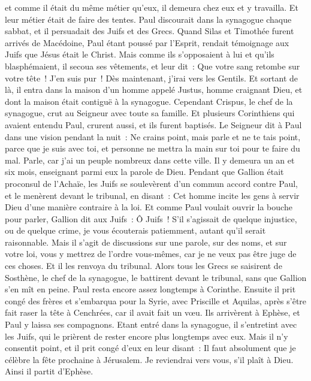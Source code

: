 \begin{multicols}{2}
et comme il était du même métier qu'eux, il demeura chez eux et y travailla. Et leur métier était de faire des tentes.
Paul discourait dans la synagogue chaque sabbat, et il persuadait des Juifs et des Grecs.
Quand Silas et Timothée furent arrivés de Macédoine, Paul étant poussé par l'Esprit, rendait témoignage aux Juifs que Jésus était le Christ.
Mais comme ils s'opposaient à lui et qu'ils blasphémaient, il secoua ses vêtements, et leur dit~: Que votre sang retombe sur votre tête~! J'en suis pur~! Dès maintenant, j'irai vers les Gentils.
Et sortant de là, il entra dans la maison d'un homme appelé Justus, homme craignant Dieu, et dont la maison était contiguë à la synagogue.
Cependant Crispus, le chef de la synagogue, crut au Seigneur avec toute sa famille. Et plusieurs Corinthiens qui avaient entendu Paul, crurent aussi, et ils furent baptisés.
Le Seigneur dit à Paul dans une vision pendant la nuit~: Ne crains point, mais parle et ne te tais point,
parce que je suis avec toi, et personne ne mettra la main sur toi pour te faire du mal. Parle, car j'ai un peuple nombreux dans cette ville.
Il y demeura un an et six mois, enseignant parmi eux la parole de Dieu.
Pendant que Gallion était proconsul de l'Achaïe, les Juifs se soulevèrent d'un commun accord contre Paul, et le menèrent devant le tribunal,
en disant~: Cet homme incite les gens à servir Dieu d'une manière contraire à la loi.
Et comme Paul voulait ouvrir la bouche pour parler, Gallion dit aux Juifs~: Ô Juifs~! S'il s'agissait de quelque injustice, ou de quelque crime, je vous écouterais patiemment, autant qu'il serait raisonnable.
Mais il s'agit de discussions sur une parole, sur des noms, et sur votre loi, vous y mettrez de l'ordre vous-mêmes, car je ne veux pas être juge de ces choses.
Et il les renvoya du tribunal.
Alors tous les Grecs se saisirent de Sosthène, le chef de la synagogue, le battirent devant le tribunal, sans que Gallion s'en mît en peine.
Paul resta encore assez longtemps à Corinthe. Ensuite il prit congé des frères et s'embarqua pour la Syrie, avec Priscille et Aquilas, après s'être fait raser la tête à Cenchrées, car il avait fait un vœu.
Ils arrivèrent à Ephèse, et Paul y laissa ses compagnons. Etant entré dans la synagogue, il s'entretint avec les Juifs,
qui le prièrent de rester encore plus longtemps avec eux.
Mais il n'y consentit point, et il prit congé d'eux en leur disant~: Il faut absolument que je célèbre la fête prochaine à Jérusalem. Je reviendrai vers vous, s'il plaît à Dieu. Ainsi il partit d'Ephèse.

\end{multicols}
